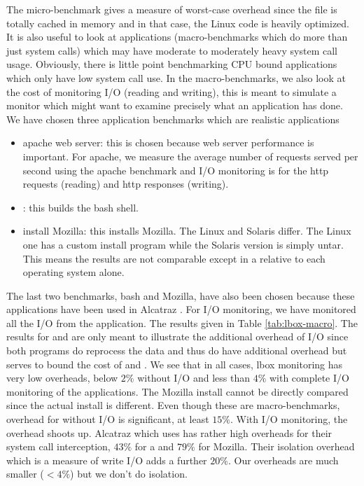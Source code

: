 The  micro-benchmark gives a measure of worst-case overhead
since the file is totally cached in memory and in that case, the Linux
 code is heavily optimized.
It is also useful to look at applications (macro-benchmarks
which do more than just system calls) which may have moderate to
moderately heavy system call usage. Obviously, there is little point
benchmarking CPU bound applications which only have low system call use.
In the macro-benchmarks, we also look at the cost of monitoring 
I/O (reading and writing), this is meant to simulate a monitor which might
want to examine precisely what an application has done.
We have chosen three application benchmarks which are realistic applications
\begin{itemize}
\item apache web server: this is chosen because web server performance
is important.
For apache, we measure the average number of requests served per second
using the apache  benchmark and I/O monitoring is for
the http requests (reading) and http responses (writing).

\item {}: this builds the bash shell.

\item install Mozilla: this installs Mozilla. The
Linux and Solaris differ. The Linux one has a custom
install program while the Solaris version is simply untar.
This means the results are not comparable except in a relative
to each operating system alone.
\end{itemize}

The last two benchmarks, bash and Mozilla,
have also been chosen because these applications
have been used in Alcatraz \cite{liang2009alcatraz}.
For I/O monitoring, we have monitored all the I/O from the application.
The results given in Table \ref{tab:lbox-macro}. 
The results for  and  are only meant to illustrate
the additional overhead of I/O since both programs do reprocess the data
and thus do have additional overhead but 
serves to bound the cost of  and .
We see that in all cases, lbox monitoring has very low overheads, below
$2\%$ without I/O and less than $4\%$ with complete I/O monitoring of the
applications.
The Mozilla install cannot be directly compared since the actual install
is different.
Even though these are macro-benchmarks, 
overhead for  without I/O is significant, at least $15\%$.
With I/O monitoring, the overhead shoots up.
Alcatraz which uses  has rather
high overheads for their system call interception, $43\%$ for a 
and $79\%$ for Mozilla. Their isolation overhead which is a measure
of write I/O adds a further $20\%$. Our overheads are much smaller ($< 4\%$)
but we don't do isolation.

